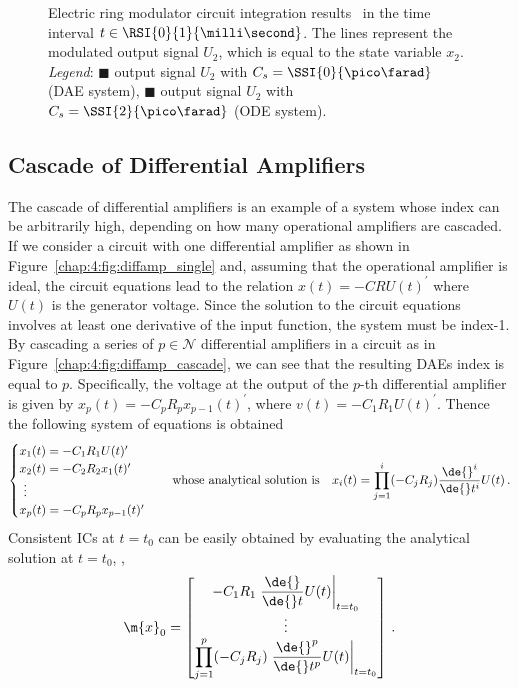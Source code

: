 \begin{figure}[htb]
  \centering
  \small{}
  \caption{Electric ring modulator circuit integration results~\cite{lioen1998test, mazzia2008test} in the time interval $t \in \RSI{0}{1}{\milli\second}$. The lines represent the modulated output signal $U_2$, which is equal to the state variable $x_2$. \emph{Legend}: \textcolor{mycolor1}{$\blacksquare$} output signal $U_2$ with $C_s = \SSI{0}{\pico\farad}$ (\ac{DAE} system), \textcolor{mycolor2}{$\blacksquare$} output signal $U_2$ with $C_s = \SSI{2}{\pico\farad}$ (\ac{ODE} system).}
  \label{chap4:fig:ring_modulator_results}
\end{figure}

\subsection{Cascade of Differential Amplifiers}

The cascade of differential amplifiers is an example of a system whose index can be arbitrarily high, depending on how many operational amplifiers are cascaded. If we consider a circuit with one differential amplifier as shown in Figure~\ref{chap:4:fig:diffamp_single} and, assuming that the operational amplifier is ideal, the circuit equations lead to the relation $x(t) = -C R U(t)^{\prime}$ where $U(t)$ is the generator voltage. Since the solution to the circuit equations involves at least one derivative of the input function, the system must be index-1. By cascading a series of $p \in \mathcal{N}$ differential amplifiers in a circuit as in Figure~\ref{chap:4:fig:diffamp_cascade}, we can see that the resulting \acp{DAE} index is equal to $p$. Specifically, the voltage at the output of the $p$-th differential amplifier is given by $x_p(t) = -C_p R_p x_{p-1}(t)^{\prime}$, where $v(t) = -C_1 R_1 U(t)^{\prime}$. Thence the following system of equations is obtained
%
\begin{equation*}
  \begin{cases}
    x_1(t) = -C_1 R_1 U(t)^{\prime} \\
    x_2(t) = -C_2 R_2 x_1(t)^{\prime} \\
    ~\vdots \\
    x_p(t) = -C_p R_p x_{p-1}(t)^{\prime}
  \end{cases}
  \quad \text{whose analytical solution is} \quad
  x_i(t) = \prod_{j=1}^{i} (-C_j R_j) \dfrac{\de{}^{i}}{\de{}t^{i}}U(t) \, \text{.}
\end{equation*}
%
Consistent \acp{IC} at $t = t_0$ can be easily obtained by evaluating the analytical solution at $t = t_0$, \ie{},
%
\begin{equation*}
  \m{x}_0 = \begin{bmatrix}
    -C_1 R_1 \left.\dfrac{\de{}}{\de{}t}U(t)\right|_{t=t_0} \\
    \vdots \\
    \displaystyle\prod_{j=1}^{p} (-C_j R_j) \left.\dfrac{\de{}^{p}}{\de{}t^{p}}U(t)\right|_{t=t_0}
  \end{bmatrix} \, \text{.}
\end{equation*}

